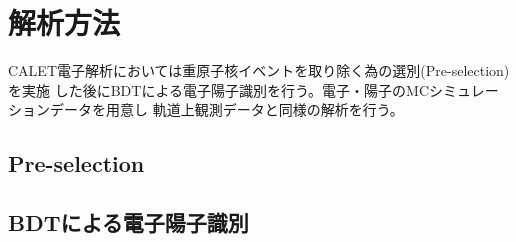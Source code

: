 \chapter{解析方法}
CALET電子解析においては重原子核イベントを取り除く為の選別(Pre-selection)を実施
した後にBDTによる電子陽子識別を行う。電子・陽子のMCシミュレーションデータを用意し
軌道上観測データと同様の解析を行う。

\section{Pre-selection}


\section{BDTによる電子陽子識別}

